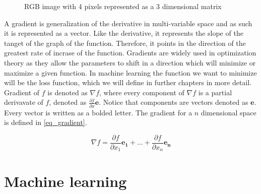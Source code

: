 \documentclass[times, utf8, diplomski]{fer}
\begin{document}
\begin{figure}
\centering
{}
\caption{RGB image with 4 pixels  represented as a 3 dimensional matrix}
\label{fig:image_matrix}
\end{figure}

A gradient is generalization of the derivative in multi-variable space and as such it is represented as a vector. Like the derivative, it represents the slope of the tanget of the graph of the function. Therefore, it points in the direction of the greatest rate of incrase of the function. Gradients are widely used in optimization theory as they allow the parameters to shift in a direction which will minimize or maximize a given function. In machine learning the function we want to minimize will be the loss function, which we will define in further chapters in more detail. Gradient of $f$ is denoted as $\nabla{f}$, where every component of $\nabla{f}$ is a partial derivavate of $f$, denoted as $\frac{\partial{f}}{\partial{x}}\mathbf{e}$. Notice that components are vectors denoted as $\mathbf{e}$. Every vector is written as a bolded letter. The gradient for a $n$ dimensional space is defined in \ref{eq_gradient}.

\begin{equation} \label{eq_gradient}
    \nabla{f}= \frac{\partial{f}}{\partial{x_{1}}}\mathbf{e_1} + \hdots + 	   \frac{\partial{f}}{\partial{x_{n}}}\mathbf{e_n}
\end{equation}

\section{Machine learning}
\end{document}
